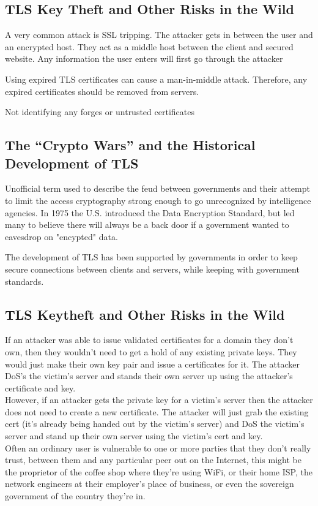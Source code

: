 \documentclass[11pt]{article} %
\begin{document}
{\subsection{TLS Key Theft and Other Risks in the Wild}
{\parindent0pt A very common attack is SSL tripping. The attacker gets in 
between the user and an encrypted host. They act as a middle host between the 
client and secured website. Any information the user enters will first go 
through the attacker}

\bigskip
{\parindent0pt Using expired TLS certificates can cause a man-in-middle attack.
Therefore, any expired certificates should be removed from servers.}

\bigskip
{\parindent0pt Not identifying any forges or untrusted certificates}

\subsection{The “Crypto Wars” and the Historical Development of TLS}
{\parindent0pt Unofficial term used to describe the feud between governments 
and their attempt to limit the access cryptography strong enough to go 
unrecognized by intelligence agencies. In 1975 the U.S. introduced the Data 
Encryption Standard, but led many to believe there will always be a back door 
if a government wanted to eavesdrop on "encypted" data.}

\bigskip
{\parindent0pt The development of TLS has been supported by governments in 
order to keep secure connections between clients and servers, while keeping 
with government standards.}

\subsection{TLS Keytheft and Other Risks in the Wild}
If an attacker was able to issue validated certificates for a domain they don’t own, then they wouldn’t need to get a hold of any existing private keys. They would just make their own key pair and issue a certificates for it. The attacker DoS’s the victim’s server and stands their own server up using the attacker’s certificate and key.
\\
However, if an attacker gets the private key for a victim’s server then the attacker does not need to create a new certificate. The attacker will just grab the existing cert (it’s already being handed out by the victim’s server) and DoS the victim’s server and stand up their own server using the victim’s cert and key.
\\
Often an ordinary user is vulnerable to one or more parties that they don't really trust, between them and any particular peer out on the Internet, this might be the proprietor of the coffee shop where they're using WiFi, or their home ISP, the network engineers at their employer's place of business, or even the sovereign government of the country they're in.

}
\end{document}
